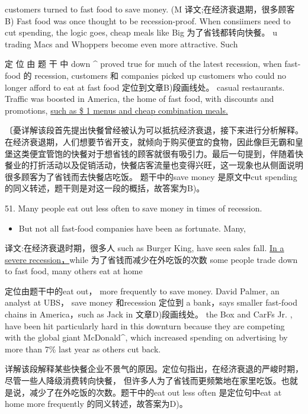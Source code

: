 \documentclass[UTF8,11pt]{ctexart}
\begin{document}
customers turned to fast food to save money. (M 译文;在经济衰退期，很多顾客 B) Fast food was once thought to be recession-proof. When consiimers need to cut spending, the logic goes, cheap meals like Big 为了省钱都转向快餐。 u trading Macs and Whoppers become even more attractive. Such


定 位 由 题 干 中 down \textasciicircum{} proved true for much of the latest recession, when fast-food 的 recession, customers 和 companies picked up customers who could no longer afford to eat at fast food 定位到文章B)段画线处。 casual restaurants. Traffic was boosted in America, the home of fast food, with discounts and promotions, \uline{such as \$ 1 menus and cheap combination meals.}


〔憂详解该段首先提出快餐曾经被认为可以抵抗经济衰退，接下来进行分析解释。在经济衰退期，人们想要节省开支，就倾向于购买便宜的食物，因此像巨无霸和皇堡这类便宜管饱的快餐对于想省钱的顾客就很有吸引力。最后一句提到，伴随着快餐业的打折活动以及促销活动，快餐店客流量也变得兴旺，这一现象也从侧面说明很多顾客为了省钱而去快餐店吃饭。 题干中的save money 是原文中cut spending 的同义转述，题干则是对这一段的概括，故答案为B)。


51. Many people eat out less often to save money in times of recession.


\begin{itemize}[leftmargin=2em,itemsep=.2em,topsep=.4em]\item[D.] But not all fast-food companies have been as fortunate. Many,
\end{itemize}

译文:在经济衰退时期，很多人 such as Burger King, have seen sales fall. \uline{In a severe recession，}while 为了省钱而减少在外吃饭的次数 some people trade down to fast food, many others eat at home


定位由题干中的eat out， more frequently to save money. David Palmer, an analyst at UBS， save money 和recession 定位到 a bank，says smaller fast-food chains in America，such as Jack in 文章D)段画线处。 the Box and CarFs Jr. , have been hit particularly hard in this downturn because they are competing with the global giant McDonald\textasciicircum{}, which increased spending on advertising by more than 7\% last year as others cut back.


详解该段解释某些快餐企业不景气的原因。定位句指出，在经济衰退的严峻时期，尽管一些人降级消费转向快餐， 但许多人为了省钱而更频繁地在家里吃饭。也就是说，减少了在外吃饭的次数。题干中的eat out less often 是定位句中eat at home more frequently 的同义转述，故答案为D)。
\end{document}
